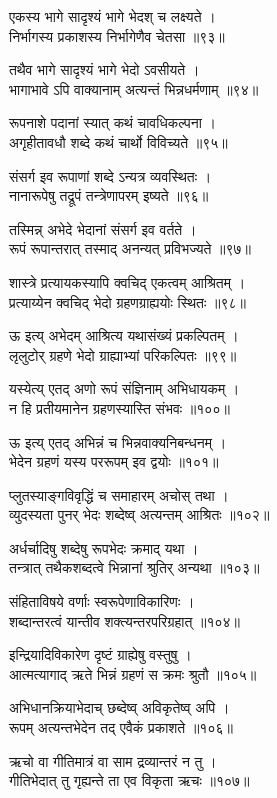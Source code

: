 एकस्य भागे सादृश्यं भागे भेदश् च लक्ष्यते ।\\निर्भागस्य प्रकाशस्य निर्भागेणैव चेतसा ॥९३॥

तथैव भागे सादृश्यं भागे भेदो ऽवसीयते ।\\भागाभावे ऽपि वाक्यानाम् अत्यन्तं भिन्नधर्मणाम् ॥९४॥

रूपनाशे पदानां स्यात् कथं चावधिकल्पना ।\\अगृहीतावधौ शब्दे कथं चार्थो विविच्यते ॥९५॥

संसर्ग इव रूपाणां शब्दे ऽन्यत्र व्यवस्थितः ।\\नानारूपेषु तद्रूपं तन्त्रेणापरम् इष्यते ॥९६॥

तस्मिन्न् अभेदे भेदानां संसर्ग इव वर्तते ।\\रूपं रूपान्तरात् तस्माद् अनन्यत् प्रविभज्यते ॥९७॥

शास्त्रे प्रत्यायकस्यापि क्वचिद् एकत्वम् आश्रितम् ।\\प्रत्याय्येन क्वचिद् भेदो ग्रहणग्राह्ययोः स्थितः ॥९८॥

ऊ इत्य् अभेदम् आश्रित्य यथासंख्यं प्रकल्पितम् ।\\लृलुटोर् ग्रहणे भेदो ग्राह्याभ्यां परिकल्पितः ॥९९॥

यस्येत्य् एतद् अणो रूपं संज्ञिनाम् अभिधायकम् ।\\न हि प्रतीयमानेन ग्रहणस्यास्ति संभवः ॥१००॥

ऊ इत्य् एतद् अभिन्नं च भिन्नवाक्यनिबन्धनम् ।\\भेदेन ग्रहणं यस्य पररूपम् इव द्वयोः ॥१०१॥

प्लुतस्याङ्गविवृद्धिं च समाहारम् अचोस् तथा ।\\व्युदस्यता पुनर् भेदः शब्देष्व् अत्यन्तम् आश्रितः ॥१०२॥

अर्धर्चादिषु शब्देषु रूपभेदः क्रमाद् यथा ।\\तन्त्रात् तथैकशब्दत्वे भिन्नानां श्रुतिर् अन्यथा ॥१०३॥

संहिताविषये वर्णाः स्वरूपेणाविकारिणः ।\\शब्दान्तरत्वं यान्तीव शक्त्यन्तरपरिग्रहात् ॥१०४॥

इन्द्रियादिविकारेण दृष्टं ग्राह्येषु वस्तुषु ।\\आत्मत्यागाद् ऋते भिन्नं ग्रहणं स क्रमः श्रुतौ ॥१०५॥

अभिधानक्रियाभेदाच् छब्देष्व् अविकृतेष्व् अपि ।\\रूपम् अत्यन्तभेदेन तद् एवैकं प्रकाशते ॥१०६॥

ऋचो वा गीतिमात्रं वा साम द्रव्यान्तरं न तु ।\\गीतिभेदात् तु गृह्यन्ते ता एव विकृता ऋचः ॥१०७॥

